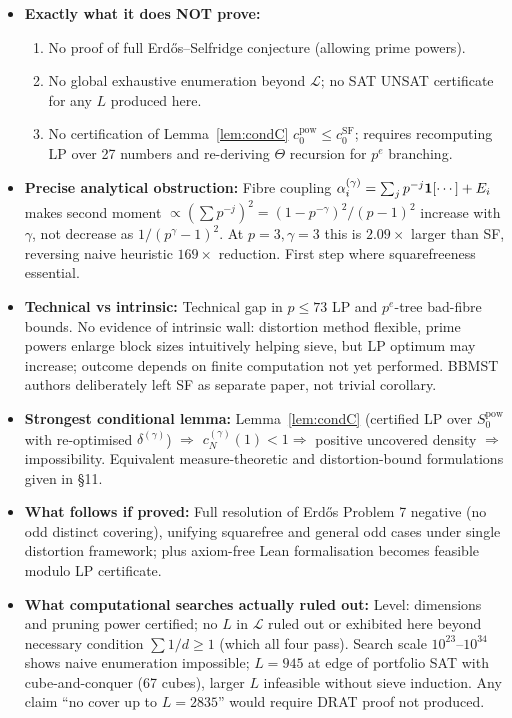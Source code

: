 \documentclass[11pt,a4paper]{article}
\theoremstyle{plain}
\theoremstyle{definition}
\theoremstyle{remark}
\newcommand{\cN}{c_{N}}
\newcommand{\cO}{c_{0}}
\begin{document}
\begin{itemize}
\item \textbf{Exactly what it does NOT prove:}
\begin{enumerate}
\item No proof of full Erd\H{o}s--Selfridge conjecture (allowing prime powers).
\item No global exhaustive enumeration beyond $\mathcal L$; no SAT UNSAT certificate for any $L$ produced here.
\item No certification of Lemma~\ref{lem:condC} $\cO^{\mathrm{pow}}\le\cO^{\mathrm{SF}}$; requires recomputing LP over 27 numbers and re-deriving $\Theta$ recursion for $p^{e}$ branching.
\end{enumerate}

\item \textbf{Precise analytical obstruction:} Fibre coupling $\alpha_{i}^{(\gamma)}=\sum_{j}p^{-j}{\bf1}[\cdots]+E_{i}$ makes second moment $\propto(\sum p^{-j})^{2}=(1-p^{-\gamma})^{2}/(p-1)^{2}$ increase with $\gamma$, not decrease as $1/(p^{\gamma}-1)^{2}$. At $p=3,\gamma=3$ this is $2.09\times$ larger than SF, reversing naive heuristic $169\times$ reduction. First step where squarefreeness essential.

\item \textbf{Technical vs intrinsic:} Technical gap in $p\le73$ LP and $p^{e}$-tree bad-fibre bounds. No evidence of intrinsic wall: distortion method flexible, prime powers enlarge block sizes intuitively helping sieve, but LP optimum may increase; outcome depends on finite computation not yet performed. BBMST authors deliberately left SF as separate paper, not trivial corollary.

\item \textbf{Strongest conditional lemma:} Lemma~\ref{lem:condC} (certified LP over $S_{0}^{\mathrm{pow}}$ with re-optimised $\delta^{(\gamma)}$) $\Rightarrow$ $\cN^{(\gamma)}(1)<1\Rightarrow$ positive uncovered density $\Rightarrow$ impossibility. Equivalent measure-theoretic and distortion-bound formulations given in \S11.

\item \textbf{What follows if proved:} Full resolution of Erd\H{o}s Problem 7 negative (no odd distinct covering), unifying squarefree and general odd cases under single distortion framework; plus axiom-free Lean formalisation becomes feasible modulo LP certificate.

\item \textbf{What computational searches actually ruled out:} Level: dimensions and pruning power certified; no $L$ in $\mathcal L$ ruled out or exhibited here beyond necessary condition $\sum1/d\ge1$ (which all four pass). Search scale $10^{23}$--$10^{34}$ shows naive enumeration impossible; $L=945$ at edge of portfolio SAT with cube-and-conquer (67 cubes), larger $L$ infeasible without sieve induction. Any claim ``no cover up to $L=2835$'' would require DRAT proof not produced.

\end{itemize}
\end{document}
